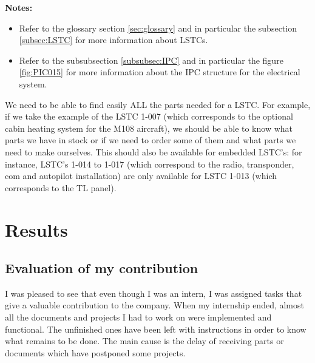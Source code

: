 \documentclass[11pt,a4paper]{article}
\begin{document}
\bigskip

\textbf{Notes:} 
\begin{itemize}
\item Refer to the glossary section \ref{sec:glossary} and in particular the subsection \ref{subsec:LSTC} for more information about LSTCs.
\item Refer to the subsubsection \ref{subsubsec:IPC} and in particular the figure \ref{fig:PIC015} for more information about the IPC structure for the electrical system.
\end{itemize}

\bigskip

We need to be able to find easily ALL the parts needed for a LSTC. For example, if we take the example of the LSTC 1-007 (which corresponds to the optional cabin heating system for the M108 aircraft), we should be able to know what parts we have in stock or if we need to order some of them and what parts we need to make ourselves.
This should also be available for embedded LSTC's: for instance, LSTC's 1-014 to 1-017 (which correspond to the radio, transponder, com and autopilot installation) are only available for LSTC 1-013 (which corresponds to the TL panel).


\newpage

\section{Results}
\subsection{Evaluation of my contribution}
 I was pleased to see that even though I was an intern, I was assigned tasks that give a valuable contribution to the company. When my internship ended, almost all the documents and projects I had to work on were implemented and functional. The unfinished ones have been left with instructions in order to know what remains to be done. The main cause is the delay of receiving parts or documents which have postponed some projects.
\end{document}
